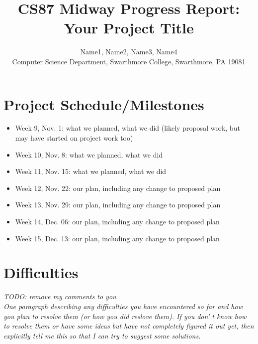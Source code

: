 \documentclass[11pt]{article}
\begin{document}
\title{CS87 Midway Progress Report: Your Project Title}

\author{Name1, Name2, Name3, Name4 \\
Computer Science Department, Swarthmore College, Swarthmore, PA  19081}

\maketitle

\section{Project Schedule/Milestones}



\begin{itemize}
  \item Week 9, Nov. 1: what we planned, what we did (likely proposal work, but may have started on project work too)
\item Week 10, Nov. 8: what we planned, what we did
\item Week 11, Nov. 15: what we planned, what we did
\item Week 12, Nov. 22: our plan, including any change to proposed plan 
\item Week 13, Nov. 29: our plan, including any change to proposed plan
\item Week 14, Dec. 06: our plan, including any change to proposed plan
\item Week 15, Dec. 13: our plan, including any change to proposed plan
\end{itemize}

\section {Difficulties}
{\it
TODO: remove my comments to you \\ 

One paragraph describing any difficulties you have encountered so far and how
you plan to resolve them (or how you did reslove them). If you don' t know how
to resolve them or have some ideas but have not completely figured it out yet,
then explicitly tell me this so that I can try to suggest some solutions.}
\end{document}
